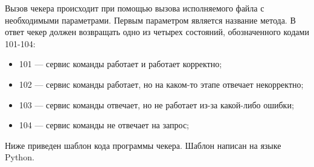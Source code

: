 Вызов чекера происходит при помощью вызова исполняемого файла с необходимыми параметрами. Первым параметром является название метода. 
В ответ чекер должен возвращать одно из четырех состояний, обозначенного кодами 101-104:
\begin{itemize}
\item 101 --- сервис команды работает и работает корректно;
\item 102 --- сервис команды работает, но на каком-то этапе отвечает некорректно;
\item 103 --- сервис команды отвечает, но не работает из-за какой-либо ошибки; 
\item 104 --- сервис команды не отвечает на запрос;
\end{itemize}


\clearpage
Ниже приведен шаблон кода программы чекера. Шаблон написан на языке Python.




\clearpage